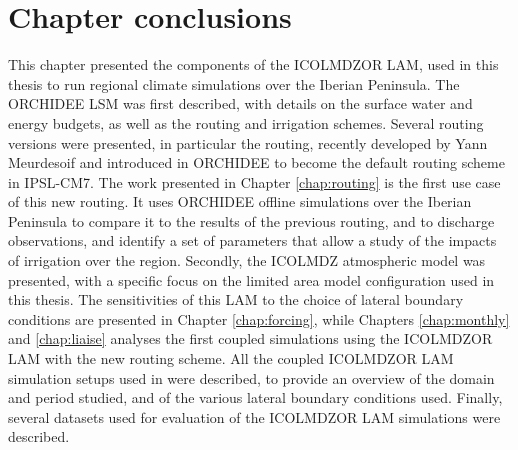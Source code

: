 \section{Chapter conclusions}
This chapter presented the components of the ICOLMDZOR LAM, used in this thesis to run regional climate simulations over the Iberian Peninsula.
The ORCHIDEE LSM was first described, with details on the surface water and energy budgets, as well as the routing and irrigation schemes. 
Several routing versions were presented, in particular the \native routing, recently developed by Yann Meurdesoif and introduced in ORCHIDEE to become the default routing scheme in IPSL-CM7. The work presented in Chapter \ref{chap:routing} is the first use case of this new routing. It uses ORCHIDEE offline simulations over the Iberian Peninsula to compare it to the results of the previous routing, and to discharge observations, and identify a set of parameters that allow a study of the impacts of irrigation over the region.
Secondly, the ICOLMDZ atmospheric model was presented, with a specific focus on the limited area model configuration used in this thesis. 
The sensitivities of this LAM to the choice of lateral boundary conditions are presented in Chapter \ref{chap:forcing}, while Chapters \ref{chap:monthly} and \ref{chap:liaise} analyses the first coupled simulations using the ICOLMDZOR LAM with the new routing scheme. 
All the coupled ICOLMDZOR LAM simulation setups used in \atmchapters were described, to provide an overview of the domain and period studied, and of the various lateral boundary conditions used. 
Finally, several datasets used for evaluation of the ICOLMDZOR LAM simulations were described.
